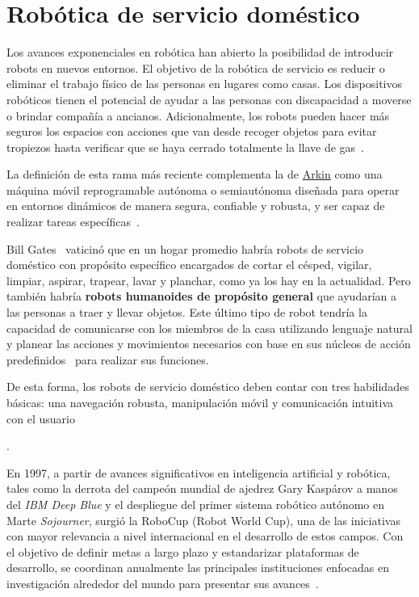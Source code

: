 \section{Robótica de servicio doméstico}

Los avances exponenciales en robótica han abierto la posibilidad de introducir robots en nuevos entornos. El objetivo de la robótica de servicio es reducir o eliminar el trabajo físico de las personas en lugares como casas. Los dispositivos robóticos tienen el potencial de ayudar a las personas con discapacidad a moverse o brindar compañía a ancianos. Adicionalmente, los robots pueden hacer más seguros los espacios con acciones que van desde recoger objetos para evitar tropiezos hasta verificar que se haya cerrado totalmente la llave de gas~\cite{yazmin_robotsServicio}.

La  definición de esta rama más reciente complementa la de \hyperlink{arkin}{Arkin} como una máquina móvil reprogramable autónoma o semiautónoma diseñada para operar en entornos dinámicos de manera segura, confiable y robusta, y ser capaz de realizar tareas específicas~\cite{yazmin_robotsServicio}.

Bill Gates~\cite{gates_article} vaticinó que en un hogar promedio habría robots de servicio doméstico con propósito específico encargados de cortar el césped, vigilar, limpiar, aspirar, trapear, lavar y planchar, como ya los hay en la actualidad. Pero también habría \textbf{robots humanoides de propósito general} que ayudarían a las personas a traer y llevar objetos. Este último tipo de robot tendría la capacidad de comunicarse con los miembros de la casa utilizando lenguaje natural y planear las acciones y movimientos necesarios con base en sus núcleos de acción predefinidos~\cite{yazmin_robotsServicio} para realizar sus funciones.

\hypertarget{basic_skills}{De esta forma, los robots de servicio doméstico deben contar con tres habilidades básicas: una navegación robusta, manipulación móvil y comunicación intuitiva con el usuario~\cite{nimbro_manipulation}}.

En 1997, a partir de avances significativos en inteligencia artificial y robótica, tales como la derrota del campeón mundial de ajedrez Gary Kaspárov a manos del \emph{IBM Deep Blue} y el despliegue del primer sistema robótico autónomo en Marte \emph{Sojourner}, surgió la RoboCup (Robot World Cup), una de las iniciativas con mayor relevancia a nivel internacional en el desarrollo de estos campos. Con el objetivo de definir metas a largo plazo y estandarizar plataformas de desarrollo, se coordinan anualmente las principales instituciones enfocadas en investigación alrededor del mundo para presentar sus avances~\cite{robocup_history}.

